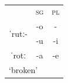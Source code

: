 \documentclass[output=paper,colorlinks,citecolor=brown]{langscibook}
\begin{document}
\begin{minipage}{\textwidth}
\begin{exe}
\begin{multicols}{3}
\begin{xlist}
				\ex \label{04ex20c} \phantom{x} \vspace*{0.2cm} \\
				\hspace*{-0.5cm}\begin{tabularx}{\linewidth}{lll}
					& \textsc{sg} & \textsc{pl} \\
					\cline{1-2}
					\multicolumn{1}{|c|}{\multirow{2}{*}{ˈrutː-}} & \multicolumn{1}{c|}{-o} & \multicolumn{1}{c}{-} \\
					\cline{2-3}
					\multicolumn{1}{|c|}{} & \multicolumn{1}{c|}{-u} & \multicolumn{1}{c|}{-i} \\
					\cline{1-3}
					\multicolumn{1}{|c|}{ˈrotː} & \multicolumn{1}{c|}{-a} & \multicolumn{1}{c|}{-e} \\
					\cline{1-3}
					\multicolumn{3}{l}{\rule{0pt}{0.5cm}‘broken’} \\
				\end{tabularx}
		\end{xlist}
	\end{multicols}
			
	\end{exe}
\end{minipage}

\bigskip
\end{document}
